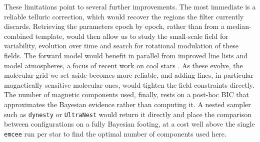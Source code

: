 
These limitations point to several further improvements. The most immediate is a reliable telluric correction, which would recover the regions the filter currently discards. Retrieving the parameters epoch by epoch, rather than from a median-combined template, would then allow us to study the small-scale field for variability, evolution over time and search for rotational modulation of these fields. The forward model would benefit in parallel from improved line lists and model atmospheres, a focus of recent work on cool stars \citep{Valyavin_2004, Stift_2016, Jarvinen_2020, Olander_2021, Gerber_2023}. As these evolve, the molecular grid we set aside becomes more reliable, and adding lines, in particular magnetically sensitive molecular ones, would tighten the field constraints directly. The number of magnetic components used, finally, rests on a post-hoc BIC that approximates the Bayesian evidence rather than computing it. A nested sampler such as \texttt{dynesty} or \texttt{UltraNest} would return it directly and place the comparison between configurations on a fully Bayesian footing, at a cost well above the single \texttt{emcee} run per star to find the optimal number of components used here.

